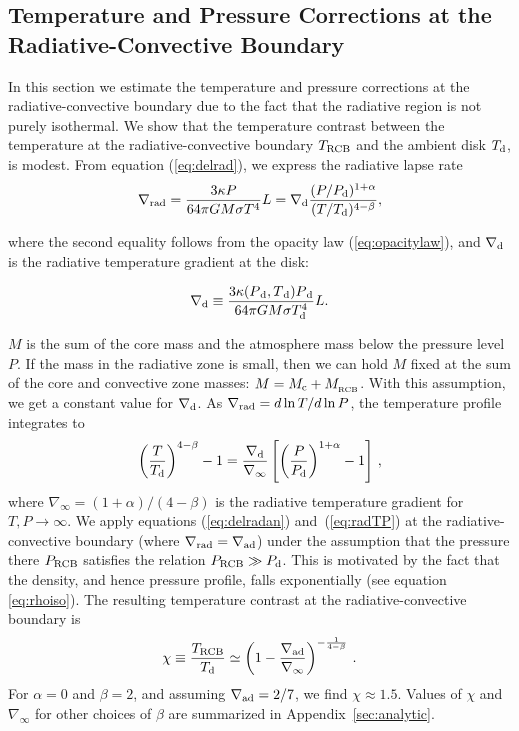 \documentclass[apj]{emulateapj}
\newcommand{\delad}{\nabla_{\rm ad}}
\newcommand{\delrad}{\nabla_{\rm rad}}
\newcommand{\Eqs}[2]{equations (\ref{#1}) and~(\ref{#2})}
\newcommand{\App}[1]{Appendix~\ref{#1}}
\newcommand{\co}{_{\rm c}}
\newcommand{\di}{_{\rm d}}
\newcommand{\cb}{_{\rm RCB}}
\begin{document}
\subsection{Temperature and Pressure Corrections at the Radiative-Convective Boundary}
\label{RCBcorr}

In this section we estimate the temperature and pressure corrections at the radiative-convective boundary due to the fact that the radiative region is not purely isothermal. We show that the temperature contrast between the temperature at the radiative-convective boundary $T_{\rm RCB}$ and the ambient disk $T_{\rm d}$, is modest.  From equation (\ref{eq:delrad}), we express the radiative lapse rate
\begin{equation}\label{eq:delradan}
\delrad = {3 \kappa P \over 64 \pi  G M \sigma T^4} L = \nabla\di {(P/P_{\rm d})^{1+\alpha} \over (T/T_{\rm d})^{4-\beta}},
\end{equation}

\noindent where the second equality follows from the opacity law (\ref{eq:opacitylaw}), and $\nabla_{\rm d}$ is the radiative temperature gradient at the disk:

\begin{equation}
\label{eq:delo}
\nabla \di \equiv \frac{3 \kappa(P{\di}, T{\di}) P{\di}}{64 \pi G M \sigma T_{\rm d}^4} L.
\end{equation}

\noindent $M$ is the sum of the core mass and the atmosphere mass below the pressure level $P$.  If the mass in the radiative zone is small, then we can hold $M$ fixed at the sum of the core and convective zone masses: $M = M\co + M_{\cb}$.   With this assumption, we get a constant value for $\nabla_{\rm d}$.  As $\delrad=d \ln T/d \ln P$, the temperature profile integrates to
\begin{equation}\label{eq:radTP}
\left(T \over T_{\rm d}\right)^{4-\beta} - 1 = {\nabla\di \over \nabla_\infty} \left[\left({P \over P_{\rm d}}\right)^{1+\alpha} - 1 \right] \, ,
\end{equation} 
where $\nabla_\infty = (1+\alpha)/(4-\beta)$ is the radiative temperature gradient for $T ,P \rightarrow \infty$.
We  apply \Eqs{eq:delradan}{eq:radTP} at the radiative-convective boundary (where $\delrad = \delad$) under the assumption that the pressure there $P\cb$ satisfies the relation $P\cb \gg P_{\rm d}$. This is motivated by the fact that the density, and hence pressure profile, falls exponentially (see equation \ref{eq:rhoiso}). The resulting temperature contrast at the radiative-convective boundary is
\begin{equation}\label{eq:Tcb}
\chi \equiv {T\cb\over T_{\rm d}} \simeq \left(1 - {\nabla_{\rm ad} \over \nabla_\infty}\right)^{-\frac{1}{4-\beta}} \, .
\end{equation} 
For  $\alpha=0$ and $\beta =2$,  and assuming $\delad = 2/7$, we find $\chi \approx 1.5$. Values of $\chi$ and $\nabla_\infty$ for other choices of $\beta$ are summarized in \App{sec:analytic}.
\end{document}
